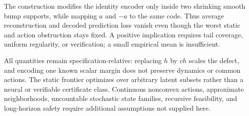 The construction modifies the identity encoder only inside two shrinking smooth bump supports,
while mapping $a$ and $-a$ to the same code.  Thus average reconstruction and decoded prediction
loss vanish even though the worst static and action obstruction stays fixed.  A positive implication
requires tail coverage, uniform regularity, or verification; a small empirical mean is insufficient.

All quantities remain specification-relative: replacing $h$ by $ch$ scales the defect, and encoding
one known scalar margin does not preserve dynamics or common actions.  The static frontier optimizes
over arbitrary latent subsets rather than a neural or verifiable certificate class.  Continuous
nonconvex actions, approximate neighborhoods, uncountable stochastic state families, recursive
feasibility, and long-horizon safety require additional assumptions not supplied here.
